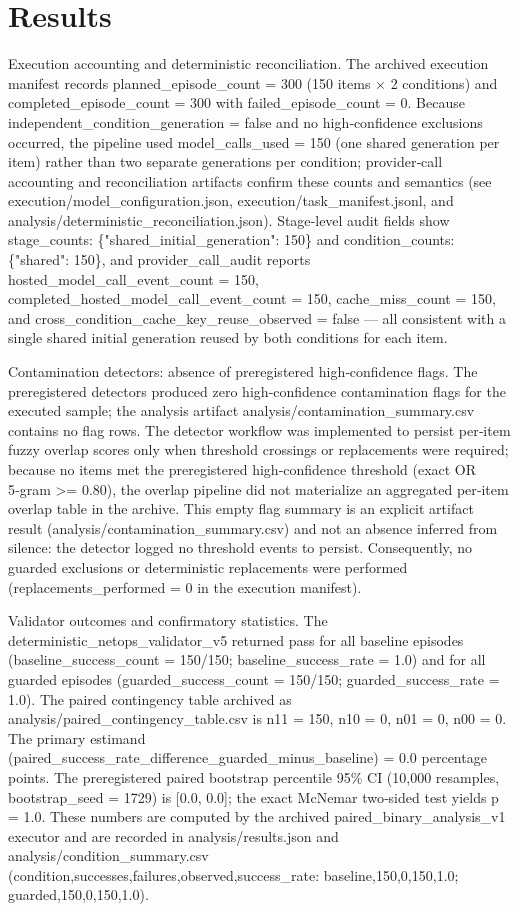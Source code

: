 \documentclass[conference]{IEEEtran}
\begin{document}
\section{Results}
Execution accounting and deterministic reconciliation. The archived execution manifest records planned\_episode\_count = 300 (150 items \ensuremath{\times} 2 conditions) and completed\_episode\_count = 300 with failed\_episode\_count = 0. Because independent\_condition\_generation = false and no high‑confidence exclusions occurred, the pipeline used model\_calls\_used = 150 (one shared generation per item) rather than two separate generations per condition; provider‑call accounting and reconciliation artifacts confirm these counts and semantics (see execution/model\_configuration.json, execution/task\_manifest.jsonl, and analysis/deterministic\_reconciliation.json). Stage‑level audit fields show stage\_counts: \{"shared\_initial\_generation": 150\} and condition\_counts: \{"shared": 150\}, and provider\_call\_audit reports hosted\_model\_call\_event\_count = 150, completed\_hosted\_model\_call\_event\_count = 150, cache\_miss\_count = 150, and cross\_condition\_cache\_key\_reuse\_observed = false --- all consistent with a single shared initial generation reused by both conditions for each item.

Contamination detectors: absence of preregistered high‑confidence flags. The preregistered detectors produced zero high‑confidence contamination flags for the executed sample; the analysis artifact analysis/contamination\_summary.csv contains no flag rows. The detector workflow was implemented to persist per‑item fuzzy overlap scores only when threshold crossings or replacements were required; because no items met the preregistered high‑confidence threshold (exact OR 5‑gram >= 0.80), the overlap pipeline did not materialize an aggregated per‑item overlap table in the archive. This empty flag summary is an explicit artifact result (analysis/contamination\_summary.csv) and not an absence inferred from silence: the detector logged no threshold events to persist. Consequently, no guarded exclusions or deterministic replacements were performed (replacements\_performed = 0 in the execution manifest).

Validator outcomes and confirmatory statistics. The deterministic\_netops\_validator\_v5 returned pass for all baseline episodes (baseline\_success\_count = 150/150; baseline\_success\_rate = 1.0) and for all guarded episodes (guarded\_success\_count = 150/150; guarded\_success\_rate = 1.0). The paired contingency table archived as analysis/paired\_contingency\_table.csv is n11 = 150, n10 = 0, n01 = 0, n00 = 0. The primary estimand (paired\_success\_rate\_difference\_guarded\_minus\_baseline) = 0.0 percentage points. The preregistered paired bootstrap percentile 95\% CI (10,000 resamples, bootstrap\_seed = 1729) is [0.0, 0.0]; the exact McNemar two‑sided test yields p = 1.0. These numbers are computed by the archived paired\_binary\_analysis\_v1 executor and are recorded in analysis/results.json and analysis/condition\_summary.csv (condition,successes,failures,observed,success\_rate: baseline,150,0,150,1.0; guarded,150,0,150,1.0).
\end{document}
